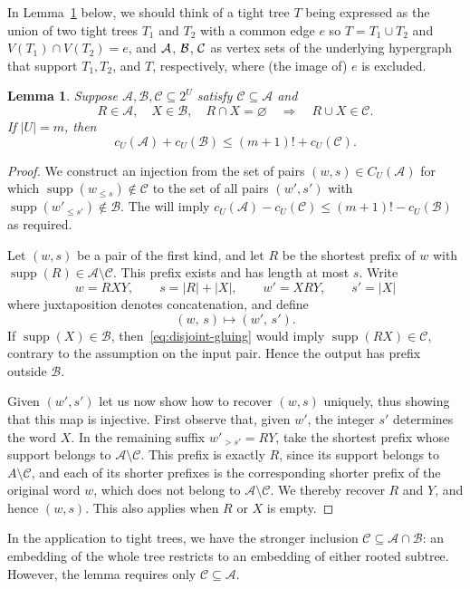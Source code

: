 \documentclass[11pt]{article}
\newtheorem{lemma}[theorem]{Lemma}
\theoremstyle{remark}
\numberwithin{equation}{section}
\DeclareMathOperator{\supp}{supp}
\begin{document}
	In Lemma~\ref{lem:prefix} below, we should think of a tight tree $T$ being expressed as the union of two tight trees $T_1$ and $T_2$ with a common edge $e$ so  $T=T_1 \cup T_2$ and $V(T_1) \cap V(T_2)=e$, 
	and $\cal A$, $\cal B$, $\cal C$ as vertex sets of the underlying hypergraph that support $T_1, T_2$, and $T$, respectively, where (the image of) $e$ is excluded.
	\begin{lemma}\label{lem:prefix}
		Suppose $\mathcal A,\mathcal B,\mathcal C\subseteq2^U$ satisfy
		$\mathcal C\subseteq\mathcal A$ and
		\begin{equation}\label{eq:disjoint-gluing}
			R\in\mathcal A,\quad X\in\mathcal B,\quad R\cap X=\varnothing
			\quad\Longrightarrow\quad R\cup X\in\mathcal C.
		\end{equation}
		If $|U|=m$, then
		\begin{equation}\label{eq:prefix-gluing}
			c_U(\mathcal A)+c_U(\mathcal B)
			\le (m+1)!+c_U(\mathcal C).
		\end{equation}
	\end{lemma}
	
	\begin{proof}
		We construct an injection from the set of pairs $(w,s)\in  
		C_U(\mathcal A)$  for which $\supp(w_{\le s})\not \in\mathcal C$ to the set of all pairs $(w', s')$ with  $\supp(w'_{\le s'})\not \in\mathcal B$. 
		The will imply
		$c_U(\mathcal A)-c_U(\mathcal C)
		\le (m+1)!-c_U(\mathcal B)$ as required.
		
		Let $(w,s)$ be a pair of the first
		kind, and let $R$ be the shortest prefix of $w$ with
		$\supp(R)\in\mathcal A\setminus\mathcal C$.
		This prefix exists and has length at most $s$. Write
		\[
		w=RXY,\qquad s=|R|+|X|,\qquad w'=XRY, \qquad s'=|X|
		\]
		where juxtaposition denotes concatenation, and define
		\begin{equation}\label{eq:prefix-map}
			(w,\,s)\longmapsto(w',\,s').
		\end{equation}
		If $\supp(X)\in\mathcal B$, then~\eqref{eq:disjoint-gluing}
		would imply $\supp(RX)\in\mathcal C$, contrary to the assumption
		on the input pair. Hence the output has prefix outside
		$\mathcal B$.
		
		
		Given $(w', s')$ let us now show how to recover $(w,s)$ uniquely, thus showing that this map is injective. First observe that, given $w'$, the integer  $s'$ determines the word
		$X$. In the remaining suffix $w'_{>s'}=RY$, take the shortest prefix whose
		support belongs to $\mathcal A \setminus \mathcal C$. This prefix
		is exactly $R$, since its support belongs to  $A\setminus\mathcal C$, and each of its shorter prefixes is
		the corresponding shorter prefix of the original word $w$, which
		does not belong to $\mathcal A \setminus \mathcal C$. We thereby recover $R$ and $Y$, and hence $(w,s)$. This also applies when $R$ or $X$ is empty.
	\end{proof}
	In the application to tight trees, we have the stronger
	inclusion $\mathcal C\subseteq\mathcal A\cap\mathcal B$:
	an embedding of the whole tree restricts to an embedding
	of either rooted subtree. However, the lemma requires
	only $\mathcal C\subseteq\mathcal A$.
	
\end{document}
